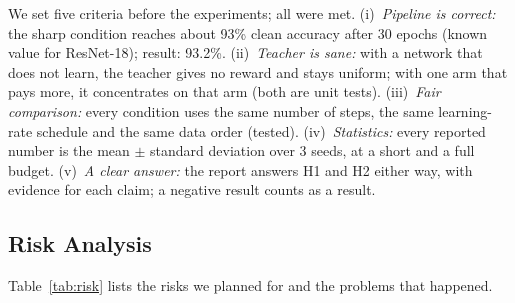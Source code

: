 \documentclass[a4paper,12pt]{report}
\begin{document}
We set five criteria before the experiments; all were met. (i)~\emph{Pipeline is correct:} the sharp condition reaches about 93\% clean accuracy after 30 epochs (known value for ResNet-18); result: 93.2\%. (ii)~\emph{Teacher is sane:} with a network that does not learn, the teacher gives no reward and stays uniform; with one arm that pays more, it concentrates on that arm (both are unit tests). (iii)~\emph{Fair comparison:} every condition uses the same number of steps, the same learning-rate schedule and the same data order (tested). (iv)~\emph{Statistics:} every reported number is the mean $\pm$ standard deviation over 3 seeds, at a short and a full budget. (v)~\emph{A clear answer:} the report answers H1 and H2 either way, with evidence for each claim; a negative result counts as a result.

\subsection{Risk Analysis}
\label{sec:risk}

Table~\ref{tab:risk} lists the risks we planned for and the problems that happened.
\end{document}
